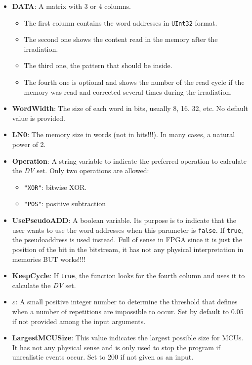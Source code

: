 \begin{itemize}
\begin{itemize}
		\item   \textbf{DATA}: A matrix with 3 or 4 columns. 
			 \begin{itemize}
			 	\item The first column contains the word addresses in \texttt{UInt32} format.
			 	\item The second one shows the content read in the memory after the irradiation.
			 	\item The third one, the pattern that should be inside.
			 	\item  The fourth one is optional and shows the number of the read cycle if the   memory was read and corrected several times during the irradiation.
			 \end{itemize}
		\item   \textbf{WordWidth}: The size of each word in bits, usually 8, 16. 32, etc. No default value is provided.
		\item   \textbf{LN0}: The memory size in words (not in bits!!!). In many cases, a natural power of 2.
		\item   \textbf{Operation}: A string variable to indicate the preferred operation to calculate
	    the \textit{DV} set. Only two operations are allowed: 
	    \begin{itemize}
	    	\item \texttt{"XOR"}: bitwise XOR.
	    	\item\texttt{"POS"}: positive subtraction
	    \end{itemize}
		\item  \textbf{UsePseudoADD}: A boolean variable. Its purpose is to indicate that the user wants to use the word addresses when this parameter is \texttt{false}. If \texttt{true}, the pseudoaddress  is used instead. Full of sense in FPGA since it is just the position  of the bit in the bitstream, it has not any physical interpretation in memories BUT works!!!!
		\item   \textbf{KeepCycle}: If \texttt{true}, the function looks for the fourth column and uses it to calculate the \textit{DV} set.
		\item   \textbf{\(\varepsilon\)}: A small positive integer number to determine the threshold that defines when a number of repetitions are impossible to occur. Set by default to 0.05 if not provided among the input arguments.
		\item  \textbf{LargestMCUSize}: This value indicates the largest possible size for MCUs. It has not any physical sense  and is only used to stop the program if unrealistic events occur. Set to 200 if not given as an input.


\end{itemize}
\end{itemize}
